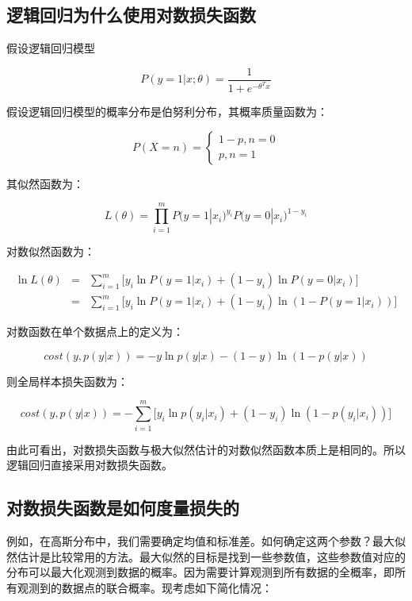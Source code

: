 \subsection{逻辑回归为什么使用对数损失函数}

假设逻辑回归模型

$$
P(y=1|x;\theta)=\frac{1}{1+e^{-\theta^{T}x}}
$$

假设逻辑回归模型的概率分布是伯努利分布，其概率质量函数为：

$$
P(X=n)=
\begin{cases}
1-p, n=0\\
 p,n=1
\end{cases}
$$

其似然函数为：

$$
L(\theta)=\prod_{i=1}^{m}
P \bigg( y=1|x_i \bigg) ^{y_i} P \bigg( y=0|x_i \bigg)^{1-y_i}
$$

对数似然函数为：

\begin{eqnarray*}
\ln L(\theta)&=&\sum_{i=1}^{m}\bigg[y_i\ln{P(y=1|x_i)}+(1-y_i)\ln{P(y=0|x_i)}\bigg] \\
&=&\sum_{i=1}^m \bigg[y_i\ln{P(y=1|x_i)}+(1-y_i)\ln(1-P(y=1|x_i))\bigg]
\end{eqnarray*}

对数函数在单个数据点上的定义为：

$$
cost(y,p(y|x))=-y\ln{ p(y|x)-(1-y)\ln(1-p(y|x))}
$$

则全局样本损失函数为：

$$
cost(y,p(y|x)) = -\sum_{i=1}^m \bigg[ y_i\ln p(y_i|x_i)+(1-y_i)\ln(1-p(y_i|x_i)) \bigg]
$$

由此可看出，对数损失函数与极大似然估计的对数似然函数本质上是相同的。所以逻辑回归直接采用对数损失函数。

\subsection{对数损失函数是如何度量损失的}

例如，在高斯分布中，我们需要确定均值和标准差。如何确定这两个参数？最大似然估计是比较常用的方法。最大似然的目标是找到一些参数值，这些参数值对应的分布可以最大化观测到数据的概率。因为需要计算观测到所有数据的全概率，即所有观测到的数据点的联合概率。现考虑如下简化情况：

